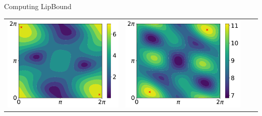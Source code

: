 \begin{frame}{Computing LipBound}

  \begin{minipage}{\textwidth}
    \centering
    \begin{tabular}{cccc}
      \includegraphics[scale=0.15]{images/contour_poly_200_1_1_3.pdf} &
      \includegraphics[scale=0.15]{images/contour_poly_200_1_9_3.pdf} & 

\end{tabular}
\end{minipage}
\end{frame}
